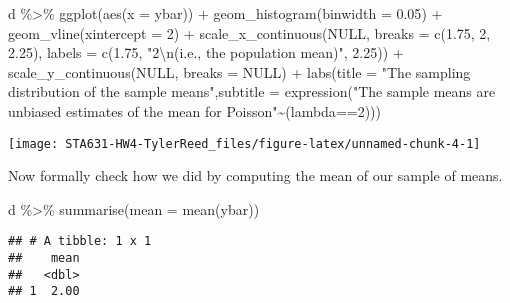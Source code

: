 \documentclass[
]{article}
\newenvironment{Shaded}{\begin{snugshade}}{\end{snugshade}}
\newcommand{\AttributeTok}[1]{\textcolor[rgb]{0.77,0.63,0.00}{#1}}
\newcommand{\ConstantTok}[1]{\textcolor[rgb]{0.00,0.00,0.00}{#1}}
\newcommand{\DecValTok}[1]{\textcolor[rgb]{0.00,0.00,0.81}{#1}}
\newcommand{\FloatTok}[1]{\textcolor[rgb]{0.00,0.00,0.81}{#1}}
\newcommand{\FunctionTok}[1]{\textcolor[rgb]{0.00,0.00,0.00}{#1}}
\newcommand{\NormalTok}[1]{#1}
\newcommand{\SpecialCharTok}[1]{\textcolor[rgb]{0.00,0.00,0.00}{#1}}
\newcommand{\StringTok}[1]{\textcolor[rgb]{0.31,0.60,0.02}{#1}}
\begin{document}
\begin{Shaded}
\begin{Highlighting}[]
\NormalTok{d }\SpecialCharTok{\%\textgreater{}\%} 
  \FunctionTok{ggplot}\NormalTok{(}\FunctionTok{aes}\NormalTok{(}\AttributeTok{x =}\NormalTok{ ybar)) }\SpecialCharTok{+}
  \FunctionTok{geom\_histogram}\NormalTok{(}\AttributeTok{binwidth =} \FloatTok{0.05}\NormalTok{) }\SpecialCharTok{+}
  \FunctionTok{geom\_vline}\NormalTok{(}\AttributeTok{xintercept =} \DecValTok{2}\NormalTok{) }\SpecialCharTok{+}
  \FunctionTok{scale\_x\_continuous}\NormalTok{(}\ConstantTok{NULL}\NormalTok{, }
                     \AttributeTok{breaks =} \FunctionTok{c}\NormalTok{(}\FloatTok{1.75}\NormalTok{, }\DecValTok{2}\NormalTok{, }\FloatTok{2.25}\NormalTok{),}
                     \AttributeTok{labels =} \FunctionTok{c}\NormalTok{(}\FloatTok{1.75}\NormalTok{, }\StringTok{"2}\SpecialCharTok{\textbackslash{}n}\StringTok{(i.e., the population mean)"}\NormalTok{, }\FloatTok{2.25}\NormalTok{)) }\SpecialCharTok{+}
  \FunctionTok{scale\_y\_continuous}\NormalTok{(}\ConstantTok{NULL}\NormalTok{, }\AttributeTok{breaks =} \ConstantTok{NULL}\NormalTok{) }\SpecialCharTok{+}
  \FunctionTok{labs}\NormalTok{(}\AttributeTok{title =} \StringTok{"The sampling distribution of the sample means"}\NormalTok{,}\AttributeTok{subtitle =} \FunctionTok{expression}\NormalTok{(}\StringTok{"The sample means are unbiased estimates of the mean for Poisson"}\SpecialCharTok{\textasciitilde{}}\NormalTok{(lambda}\SpecialCharTok{==}\DecValTok{2}\NormalTok{)))}
\end{Highlighting}
\end{Shaded}

\begin{center}\texttt{[image: STA631-HW4-TylerReed\_files/figure-latex/unnamed-chunk-4-1]} \end{center}

Now formally check how we did by computing the mean of our sample of
means.

\begin{Shaded}
\begin{Highlighting}[]
\NormalTok{d }\SpecialCharTok{\%\textgreater{}\%} 
  \FunctionTok{summarise}\NormalTok{(}\AttributeTok{mean =} \FunctionTok{mean}\NormalTok{(ybar))}
\end{Highlighting}
\end{Shaded}

\begin{verbatim}
## # A tibble: 1 x 1
##    mean
##   <dbl>
## 1  2.00
\end{verbatim}
\end{document}
